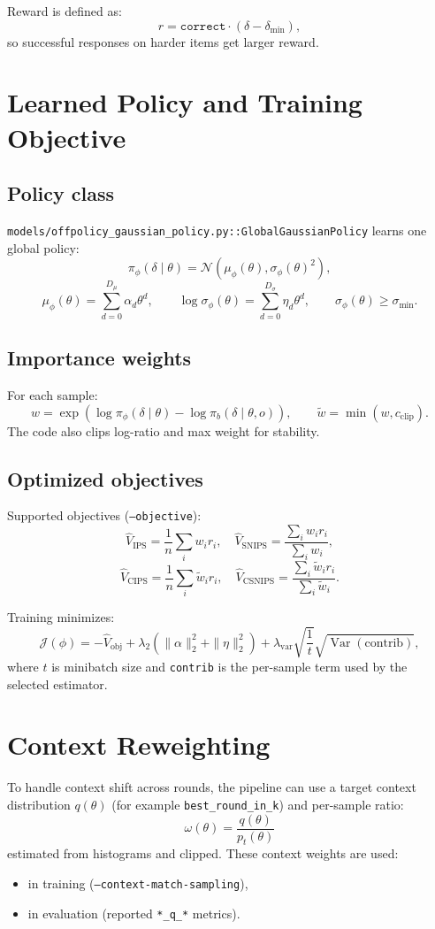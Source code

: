 \documentclass[11pt]{article}
\begin{document}
Reward is defined as:
\[
r = \texttt{correct}\cdot(\delta-\delta_{\min}),
\]
so successful responses on harder items get larger reward.

\section{Learned Policy and Training Objective}
\subsection{Policy class}
\texttt{models/offpolicy\_gaussian\_policy.py::GlobalGaussianPolicy} learns one global policy:
\[
\pi_\phi(\delta\mid\theta)=\mathcal{N}(\mu_\phi(\theta),\sigma_\phi(\theta)^2),
\]
\[
\mu_\phi(\theta)=\sum_{d=0}^{D_\mu}\alpha_d\theta^d,\qquad
\log \sigma_\phi(\theta)=\sum_{d=0}^{D_\sigma}\eta_d\theta^d,\qquad
\sigma_\phi(\theta)\ge \sigma_{\min}.
\]

\subsection{Importance weights}
For each sample:
\[
w=\exp\left(\log \pi_\phi(\delta\mid\theta)-\log \pi_b(\delta\mid\theta,o)\right),
\qquad
\tilde{w}=\min(w,c_{\text{clip}}).
\]
The code also clips log-ratio and max weight for stability.

\subsection{Optimized objectives}
Supported objectives (\texttt{--objective}):
\[
\widehat{V}_{\text{IPS}}=\frac{1}{n}\sum_i w_i r_i,\quad
\widehat{V}_{\text{SNIPS}}=\frac{\sum_i w_i r_i}{\sum_i w_i},
\]
\[
\widehat{V}_{\text{CIPS}}=\frac{1}{n}\sum_i \tilde{w}_i r_i,\quad
\widehat{V}_{\text{CSNIPS}}=\frac{\sum_i \tilde{w}_i r_i}{\sum_i \tilde{w}_i}.
\]

Training minimizes:
\[
\mathcal{J}(\phi)=
-\widehat{V}_{\text{obj}}
+\lambda_2\left(\|\alpha\|_2^2+\|\eta\|_2^2\right)
+\lambda_{\text{var}}\sqrt{\frac{1}{t}}\sqrt{\operatorname{Var}(\text{contrib})},
\]
where $t$ is minibatch size and \texttt{contrib} is the per-sample term used by the selected estimator.

\section{Context Reweighting}
To handle context shift across rounds, the pipeline can use a target context distribution $q(\theta)$ (for example \texttt{best\_round\_in\_k}) and per-sample ratio:
\[
\omega(\theta)=\frac{q(\theta)}{p_t(\theta)}
\]
estimated from histograms and clipped. These context weights are used:
\begin{itemize}
  \item in training (\texttt{--context-match-sampling}),
  \item in evaluation (reported \texttt{*\_q\_*} metrics).
\end{itemize}
\end{document}
